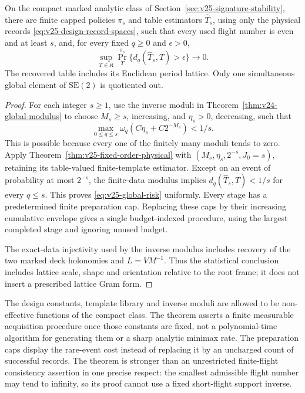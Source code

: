 \begin{theorem}
\label{thm:v25-global-physical-reconstruction}
\label{thm:v24-physical-global-reconstruction}
On the compact marked analytic class of
Section~\ref{sec:v25-signature-stability}, there are finite capped policies
\(\pi_s\) and table estimators \(\widehat T_s\), using only the physical
records \eqref{eq:v25-design-record-spaces}, such that every used flight
number is even and at least \(s\), and, for every fixed \(q\ge0\) and
\(\epsilon>0\),
\begin{equation}\label{eq:v25-global-risk}
 \sup_{T\in\mathfrak K}\Pr_T^{\pi_s}
                  \{d_q(\widehat T_s,T)>\epsilon\}\longrightarrow0.
\end{equation}
The recovered table includes its Euclidean period lattice.  Only one
simultaneous global element of \(\mathrm{SE}(2)\) is quotiented out.
\end{theorem}

\begin{proof}
For each integer \(s\ge1\), use the inverse moduli in
Theorem~\ref{thm:v24-global-modulus} to choose \(M_s\ge s\), increasing,
and \(\eta_s>0\), decreasing, such that
\[
 \max_{0\le q\le s}\omega_q(C\eta_s+C2^{-M_s})<1/s.
\]
This is possible because every one of the finitely many moduli tends to
zero.  Apply Theorem~\ref{thm:v25-fixed-order-physical} with
\((M_s,\eta_s,2^{-s},J_0=s)\), retaining its table-valued finite-template
estimator.  Except on an event of probability at most \(2^{-s}\), the
finite-data modulus implies \(d_q(\widehat T_s,T)<1/s\) for every
\(q\le s\).  This proves \eqref{eq:v25-global-risk} uniformly.  Every
stage has a predetermined finite preparation cap.  Replacing these caps by
their increasing cumulative envelope gives a single budget-indexed
procedure, using the largest completed stage and ignoring unused budget.

The exact-data injectivity used by the inverse modulus includes recovery of
the two marked deck holonomies and \(L=VM^{-1}\).  Thus the statistical
conclusion includes lattice scale, shape and orientation relative to the
root frame; it does not insert a prescribed lattice Gram form.
\end{proof}

The design constants, template library and inverse moduli are allowed to be
non-effective functions of the compact class.  The theorem asserts a finite
measurable acquisition procedure once those constants are fixed, not a
polynomial-time algorithm for generating them or a sharp analytic minimax
rate.  The preparation caps display the rare-event cost instead of replacing
it by an uncharged count of successful records.  The theorem is stronger
than an unrestricted finite-flight consistency assertion in one precise
respect: the smallest admissible flight number may tend to infinity, so its
proof cannot use a fixed short-flight support inverse.
